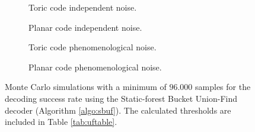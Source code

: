 \begin{figure}[htbp]
  \centering
  \begin{subfigure}[b]{0.49\textwidth}
      \begin{adjustbox}{Clip=0 1em 0 0}
        
      \end{adjustbox}
      \caption{Toric code independent noise.}
  \end{subfigure}
  \begin{subfigure}[b]{0.49\textwidth}
      \begin{adjustbox}{Clip=0 1em 0 0}
        
      \end{adjustbox}
      \caption{Planar code independent noise.}
  \end{subfigure}
  \begin{subfigure}[b]{0.49\textwidth}
      \begin{adjustbox}{Clip=0 1em 0 0}
        
      \end{adjustbox}
      \caption{Toric code phenomenological noise.}
  \end{subfigure}
  \begin{subfigure}[b]{0.49\textwidth}
      \begin{adjustbox}{Clip=0 1em 0 0}
        
      \end{adjustbox}
      \caption{Planar code phenomenological noise.}
  \end{subfigure}
  \caption{Monte Carlo simulations with a minimum of $96.000$ samples for the decoding success rate using the Static-forest Bucket Union-Find decoder (Algorithm \ref{algo:sbuf}). The calculated thresholds are included in Table \ref{tab:uftable}.}\label{fig:threshold_sbuf}
\end{figure}


